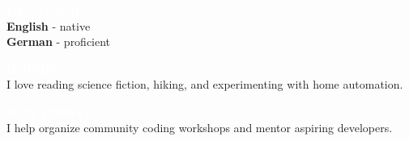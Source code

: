 \documentclass[9pt]{developercv} %
\renewcommand{\cvsect}[1]{%
    \vspace{\baselineskip} %
    \colorbox{primary}{\textcolor{white}{\MakeUppercase{\textbf{#1}}}}\\%
}
\begin{document}
\begin{minipage}[t]{0.3\textwidth}
    \vspace{-\baselineskip} %

    \cvsect{Languages}
    
    \textbf{English} - native\\
    \textbf{German} - proficient
\end{minipage}
\hfill
\begin{minipage}[t]{0.3\textwidth}
    \vspace{-\baselineskip} %
    
    \cvsect{Hobbies}
    
    I love reading science fiction, hiking, and experimenting with home automation.
\end{minipage}
\hfill
\begin{minipage}[t]{0.3\textwidth}
    \vspace{-\baselineskip} %
    
    \cvsect{Non profit}
    
    I help organize community coding workshops and mentor aspiring developers.
\end{minipage}

\end{document}
